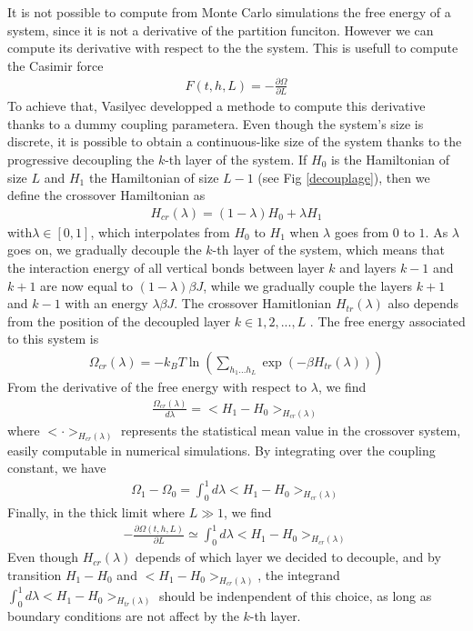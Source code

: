 It is not possible to compute from Monte Carlo simulations the free energy of a system, since it is not a derivative of the partition funciton. However we can compute its derivative with respect to the the system. This is usefull to compute the Casimir force 
\begin{align}
    F(t,h,L) = - \frac{\partial \Omega}{\partial L}
    \label{casmir-mc}
\end{align}
To achieve that, Vasilyec \cite{vasilyev_universal_2009} developped a methode to compute this derivative thanks to a dummy coupling parametera. Even though the system's size is discrete, it is possible to obtain a continuous-like size of the system thanks to the progressive decoupling the $k$-th layer of the system. If $H_0$ is the Hamiltonian of size $L$ and $H_1$ the Hamiltonian of size $L-1$ (see Fig \ref{decouplage}), then we define the crossover Hamiltonian as
\begin{align}
    H_{cr}(\lambda) = (1-\lambda) H_0 + \lambda H_1
    \label{hamil-trans}
\end{align}
with$\lambda \in [0,1]$, which interpolates from $H_0$ to $H_1$ when $\lambda$ goes from $0$ to $1$. As $\lambda$ goes on, we gradually decouple the $k$-th layer of the system, which means that the interaction energy of all vertical bonds between layer $k$ and layers $k-1$ and $k+1$ are now equal to $(1-\lambda)\beta J$, while we gradually couple the layers $k+1$ and $k-1$ with an energy $\lambda \beta J$.
The crossover Hamitlonian $H_{tr}(\lambda)$ also depends from the position of the decoupled layer $k \in {1,2,...,L}$ . The free energy associated to this system is
\begin{align}
    \Omega_{cr}(\lambda) = -k_B T \ln \left( \sum_{h_1 ... h_L} \exp(-\beta H_{tr}(\lambda)) \right)
\end{align}
From the derivative of the free energy with respect to $\lambda$, we find
\begin{align}
    \frac{\Omega_{cr}(\lambda)}{d\lambda} = < H_1 - H_0>_{H_{cr}(\lambda)}
\end{align}
where  $< \cdot >_{H_{cr}(\lambda)}$ represents the statistical mean value in the crossover system, easily computable in numerical simulations. By integrating over the coupling constant, we have
\begin{align}
    \Omega_1 - \Omega_0 = \int_0^1 d\lambda  < H_1 - H_0>_{H_{cr}(\lambda)}
\end{align}
Finally, in the thick limit where $L\gg1$, we find
\begin{align}
   - \frac{\partial \Omega(t,h,L)}{\partial L} \simeq  \int_0^1 d\lambda  < H_1 - H_0>_{H_{cr}(\lambda)}
\end{align}
Even though $H_{cr}(\lambda)$ depends of which layer we decided to decouple, and by transition $H_1-H_0$ and $< H_1 - H_0>_{H_{cr}(\lambda)}$, the integrand $\int_0^1 d\lambda < H_1 - H_0>_{H_{tr}(\lambda)}$ should be indenpendent of this choice, as long as boundary conditions are not affect by the $k$-th layer.


